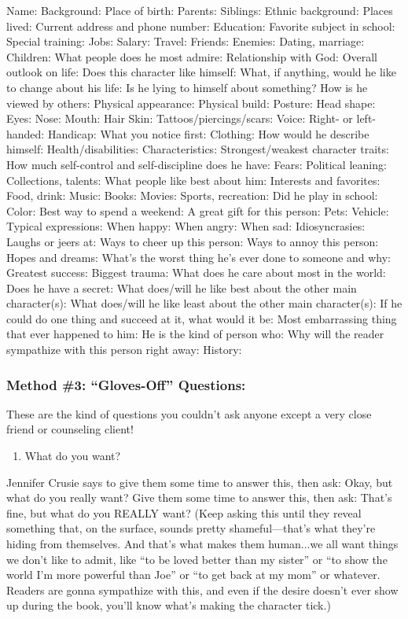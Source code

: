 \documentclass[openleft,oneside,showtrims]{memoir}
\begin{document}
Name:
Background:
Place of birth:
Parents:
Siblings:
Ethnic background:
Places lived:
Current address and phone number:
Education:
Favorite subject in school:
Special training: Jobs:
Salary:
Travel:
Friends:
Enemies:
Dating, marriage:
Children:
What people does he most admire:
Relationship with God:
Overall outlook on life:
Does this character like himself:
What, if anything, would he like to change about his life:
Is he lying to himself about something?
How is he viewed by others:
Physical appearance:
Physical build:
Posture:
Head shape:
Eyes:
Nose:
Mouth:
Hair
Skin:
Tattoos/piercings/scars:
Voice:
Right- or left-handed:
Handicap:
What you notice first:
Clothing:
How would he describe himself:
Health/disabilities:
Characteristics:
Strongest/weakest character traits:
How much self-control and self-discipline does he have:
Fears:
Political leaning:
Collections, talents:
What people like best about him:
Interests and favorites:
Food, drink:
Music:
Books:
Movies:
Sports, recreation:
Did he play in school:
Color:
Best way to spend a weekend:
A great gift for this person:
Pets:
Vehicle:
Typical expressions:
When happy:
When angry:
When sad:
Idiosyncrasies:
Laughs or jeers at:
Ways to cheer up this person:
Ways to annoy this person:
Hopes and dreams:
What’s the worst thing he’s ever done to someone and why:
Greatest success:
Biggest trauma:
What does he care about most in the world:
Does he have a secret:
What does/will he like best about the other main character(s):
What does/will he like least about the other main character(s):
If he could do one thing and succeed at it, what would it be:
Most embarrassing thing that ever happened to him:
He is the kind of person who:
Why will the reader sympathize with this person right away:
History:

\subsubsection*{Method \#3: ``Gloves-Off'' Questions:}
\label{sec:org27d04a9}

These are the kind of questions you couldn’t ask anyone except a very close friend or counseling client!

\begin{enumerate}
\item What do you want?
\end{enumerate}

Jennifer Crusie says to give them some time to answer this, then ask: Okay, but what do you really want?
Give them some time to answer this, then ask: That's fine, but what do you REALLY want?
(Keep asking this until they reveal something that, on the surface, sounds pretty shameful—that's what they're hiding from themselves. And that's what makes them human...we all want things we don't like to admit, like ``to be loved better than my sister'' or ``to show the world I'm more powerful than Joe'' or ``to get back at my mom'' or whatever. Readers are gonna sympathize with this, and even if the desire doesn't ever show up during the book, you'll know what's making the character tick.)
\end{document}
